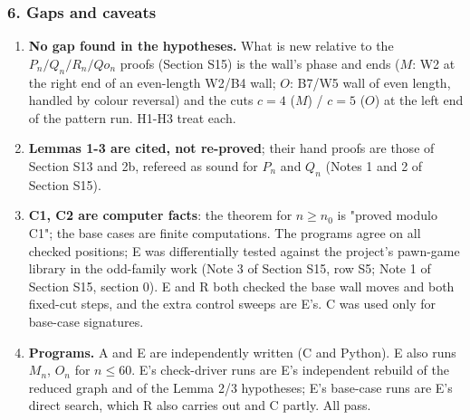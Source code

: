 \subsubsection*{6. Gaps and caveats}
\begin{enumerate}
\item \textbf{No gap found in the hypotheses.} What is new relative to the $P_n/Q_n/R_n/Qo_n$ proofs (Section S15) is the wall's phase and ends ($M$: W2 at the right end of an even-length W2/B4 wall; $O$: B7/W5 wall of even length, handled by colour reversal) and the cuts $c=4$ ($M$) / $c=5$ ($O$) at the left end of the pattern run. H1-H3 treat each.
\item \textbf{Lemmas 1-3 are cited, not re-proved}; their hand proofs are those of Section S13 and 2b, refereed as sound for $P_n$ and $Q_n$ (Notes 1 and 2 of Section S15).
\item \textbf{C1, C2 are computer facts}: the theorem for $n\ge n_0$ is "proved modulo C1"; the base cases are finite computations. The programs agree on all checked positions; E was differentially tested against the project's pawn-game library in the odd-family work (Note 3 of Section S15, row S5; Note 1 of Section S15, section 0). E and R both checked the base wall moves and both fixed-cut steps, and the extra control sweeps are E's. C was used only for base-case signatures.
\item \textbf{Programs.} A and E are independently written (C and Python). E also runs $M_n$, $O_n$ for $n\le60$. E's check-driver runs are E's independent rebuild of the reduced graph and of the Lemma 2/3 hypotheses; E's base-case runs are E's direct search, which R also carries out and C partly. All pass.
\end{enumerate}
